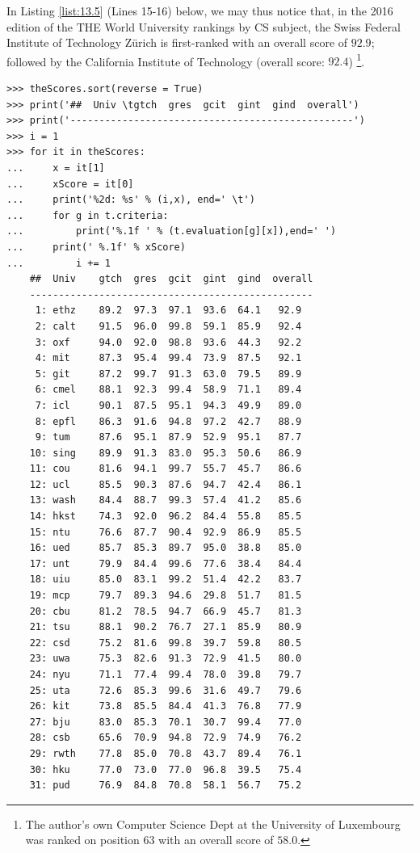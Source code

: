 In Listing \ref{list:13.5} (Lines 15-16) below, we may thus notice that, in the 2016 edition of the THE World University rankings by CS subject, the Swiss Federal Institute of Technology Zürich is first-ranked with an overall score of $92.9$; followed by the California Institute of Technology (overall score: $92.4$) \footnote{The author's own Computer Science Dept at the University of Luxembourg was ranked on position 63 with an overall score of $58.0$.}.
\begin{lstlisting}[caption={Printing the ranked performance table},label=list:13.5]
>>> theScores.sort(reverse = True)
>>> print('##  Univ \tgtch  gres  gcit  gint  gind  overall')
>>> print('-------------------------------------------------') 
>>> i = 1
>>> for it in theScores:
...     x = it[1]
...     xScore = it[0]
...     print('%2d: %s' % (i,x), end=' \t')
...     for g in t.criteria:
...         print('%.1f ' % (t.evaluation[g][x]),end=' ')
...	    print(' %.1f' % xScore)
...         i += 1   
    ##  Univ 	gtch  gres  gcit  gint  gind  overall
    -------------------------------------------------
     1: ethz 	89.2  97.3  97.1  93.6  64.1   92.9
     2: calt 	91.5  96.0  99.8  59.1  85.9   92.4
     3: oxf 	94.0  92.0  98.8  93.6  44.3   92.2
     4: mit 	87.3  95.4  99.4  73.9  87.5   92.1
     5: git 	87.2  99.7  91.3  63.0  79.5   89.9
     6: cmel 	88.1  92.3  99.4  58.9  71.1   89.4
     7: icl 	90.1  87.5  95.1  94.3  49.9   89.0
     8: epfl 	86.3  91.6  94.8  97.2  42.7   88.9
     9: tum 	87.6  95.1  87.9  52.9  95.1   87.7
    10: sing 	89.9  91.3  83.0  95.3  50.6   86.9
    11: cou 	81.6  94.1  99.7  55.7  45.7   86.6
    12: ucl 	85.5  90.3  87.6  94.7  42.4   86.1
    13: wash 	84.4  88.7  99.3  57.4  41.2   85.6
    14: hkst 	74.3  92.0  96.2  84.4  55.8   85.5
    15: ntu 	76.6  87.7  90.4  92.9  86.9   85.5
    16: ued 	85.7  85.3  89.7  95.0  38.8   85.0
    17: unt 	79.9  84.4  99.6  77.6  38.4   84.4
    18: uiu 	85.0  83.1  99.2  51.4  42.2   83.7
    19: mcp 	79.7  89.3  94.6  29.8  51.7   81.5
    20: cbu 	81.2  78.5  94.7  66.9  45.7   81.3
    21: tsu 	88.1  90.2  76.7  27.1  85.9   80.9
    22: csd 	75.2  81.6  99.8  39.7  59.8   80.5
    23: uwa 	75.3  82.6  91.3  72.9  41.5   80.0
    24: nyu 	71.1  77.4  99.4  78.0  39.8   79.7
    25: uta 	72.6  85.3  99.6  31.6  49.7   79.6
    26: kit 	73.8  85.5  84.4  41.3  76.8   77.9
    27: bju 	83.0  85.3  70.1  30.7  99.4   77.0
    28: csb 	65.6  70.9  94.8  72.9  74.9   76.2
    29: rwth 	77.8  85.0  70.8  43.7  89.4   76.1
    30: hku 	77.0  73.0  77.0  96.8  39.5   75.4
    31: pud 	76.9  84.8  70.8  58.1  56.7   75.2

\end{lstlisting}
